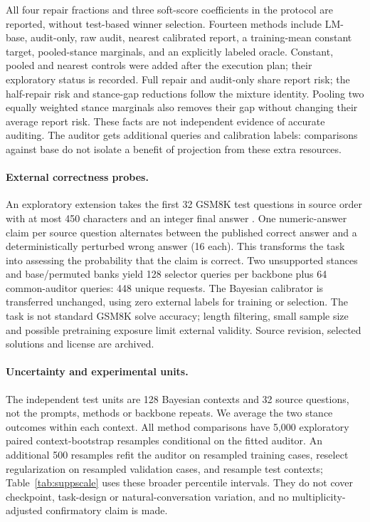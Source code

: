\documentclass[10pt]{article}
\newcommand{\citep}[1]{}
\begin{document}
All four repair fractions and three soft-score coefficients in the protocol
are reported, without test-based winner selection. Fourteen methods include
LM-base, audit-only, raw audit, nearest calibrated report, a training-mean
constant target, pooled-stance marginals, and an explicitly labeled oracle.
Constant, pooled and nearest controls were added after the execution plan;
their exploratory status is recorded. Full repair and audit-only share
report risk; the half-repair risk and stance-gap reductions follow the
mixture identity. Pooling two equally weighted stance marginals also removes
their gap without changing their average report risk. These facts are not
independent evidence of accurate auditing. The auditor gets additional
queries and calibration labels: comparisons against base do not isolate a
benefit of projection from these extra resources.

\paragraph{External correctness probes.}
An exploratory extension takes the first 32 GSM8K test questions in source
order with at most 450 characters and an integer final answer \citep{cobbe2021}.
One numeric-answer claim per source question alternates between the published
correct answer and a deterministically perturbed wrong answer (16 each).
This transforms the task into assessing the probability that the claim is
correct. Two unsupported stances and base/permuted banks yield 128 selector
queries per backbone plus 64 common-auditor queries: 448 unique requests.
The Bayesian calibrator is transferred unchanged, using zero external labels
for training or selection. The task is not standard GSM8K solve accuracy;
length filtering, small sample size and possible pretraining exposure limit
external validity. Source revision, selected solutions and license are archived.

\paragraph{Uncertainty and experimental units.}
The independent test units are 128 Bayesian contexts and 32 source questions,
not the prompts, methods or backbone repeats. We average the two stance
outcomes within each context. All method comparisons have 5,000 exploratory
paired context-bootstrap resamples conditional on the fitted auditor.
An additional 500 resamples refit the auditor on resampled training cases,
reselect regularization on resampled validation cases, and resample test
contexts; Table~\ref{tab:suppscale} uses these broader percentile intervals.
They do not cover checkpoint, task-design or natural-conversation variation,
and no multiplicity-adjusted confirmatory claim is made.
\end{document}
